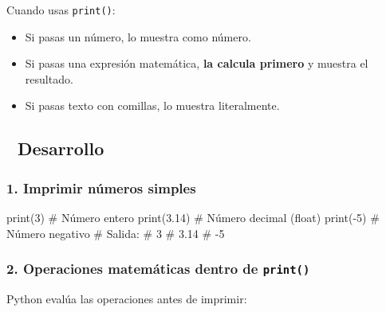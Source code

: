 \documentclass[
  doc,
  floatsintext,
  longtable,
  a4paper,
  nolmodern,
  notxfonts,
  notimes,
  12pt,
  colorlinks=true,linkcolor=blue,citecolor=blue,urlcolor=blue]{apa7}
\newenvironment{Shaded}{\begin{snugshade}}{\end{snugshade}}
\newcommand{\BuiltInTok}[1]{\textcolor[rgb]{0.00,0.23,0.31}{#1}}
\newcommand{\CommentTok}[1]{\textcolor[rgb]{0.37,0.37,0.37}{#1}}
\newcommand{\DecValTok}[1]{\textcolor[rgb]{0.68,0.00,0.00}{#1}}
\newcommand{\FloatTok}[1]{\textcolor[rgb]{0.68,0.00,0.00}{#1}}
\newcommand{\NormalTok}[1]{\textcolor[rgb]{0.00,0.23,0.31}{#1}}
\newcommand{\OperatorTok}[1]{\textcolor[rgb]{0.37,0.37,0.37}{#1}}
\providecommand{\tightlist}{%
  \setlength{\itemsep}{0pt}\setlength{\parskip}{0pt}}
\begin{document}
Cuando usas \texttt{print()}:

\begin{itemize}
\tightlist
\item
  Si pasas un número, lo muestra como número.
\item
  Si pasas una expresión matemática, \textbf{la calcula primero} y
  muestra el resultado.
\item
  Si pasas texto con comillas, lo muestra literalmente.
\end{itemize}

\subsection{📐 Desarrollo}\label{desarrollo}

\subsubsection{1. Imprimir números
simples}\label{imprimir-nuxfameros-simples}

\begin{Shaded}
\begin{Highlighting}[]
\BuiltInTok{print}\NormalTok{(}\DecValTok{3}\NormalTok{)      }\CommentTok{\# Número entero}
\BuiltInTok{print}\NormalTok{(}\FloatTok{3.14}\NormalTok{)   }\CommentTok{\# Número decimal (float)}
\BuiltInTok{print}\NormalTok{(}\OperatorTok{{-}}\DecValTok{5}\NormalTok{)     }\CommentTok{\# Número negativo}
\CommentTok{\# Salida:}
\CommentTok{\# 3}
\CommentTok{\# 3.14}
\CommentTok{\# {-}5}
\end{Highlighting}
\end{Shaded}

\subsubsection{\texorpdfstring{2. Operaciones matemáticas dentro de
\texttt{print()}}{2. Operaciones matemáticas dentro de print()}}\label{operaciones-matemuxe1ticas-dentro-de-print}

Python evalúa las operaciones antes de imprimir:
\end{document}
